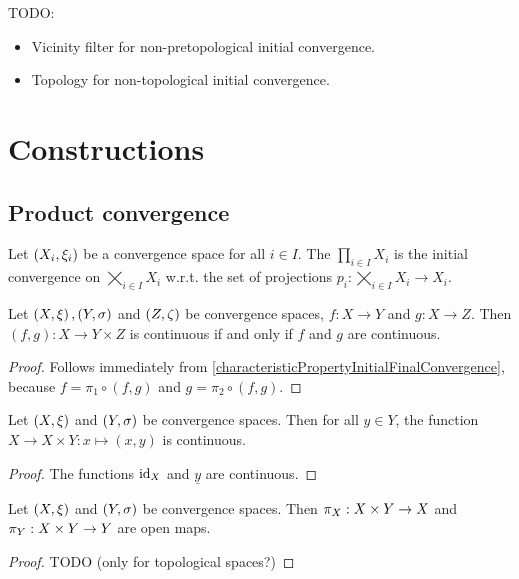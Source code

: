 TODO:
\begin{itemize}
\item Vicinity filter for non-pretopological initial convergence.
\item Topology for non-topological initial convergence.
\end{itemize}


\section{Constructions}
\subsection{Product convergence}
\begin{definition}
Let $\left( X_i, \xi_i \right)$ be a convergence space for all $i\in I$. The  $\prod_{i\in I}X_i$ is the initial convergence on $\bigtimes_{i\in I}X_i$ w.r.t. the set of projections $p_i: \bigtimes_{i\in I}X_i \to X_i$.
\end{definition}

\begin{lemma} \label{continuityFunctionTuple}
Let $\left( X,\xi \right), \left( Y,\sigma \right)$ and $\left( Z,\zeta \right)$ be convergence spaces, $f: X\to Y$ and $g: X\to Z$. Then $(f,g): X\to Y\times Z$ is continuous \textup{if and only if} $f$ and $g$ are continuous.
\end{lemma}
\begin{proof}
Follows immediately from \ref{characteristicPropertyInitialFinalConvergence},
because $f = \pi_1\circ (f,g)$ and $g = \pi_2\circ (f,g)$.
\end{proof}
\begin{corollary} \label{continuousEmbeddingProduct}
Let $\left( X,\xi \right)$ and $\left( Y,\sigma \right)$ be convergence spaces. Then for all $y\in Y$, the function $X\to X\times Y: x\mapsto (x,y)$ is continuous.
\end{corollary}
\begin{proof}
The functions $\operatorname{id}_X$ and $\underline{y}$ are continuous.
\end{proof}

\begin{proposition}
Let $\left( X,\xi \right)$ and $\left( Y,\sigma \right)$ be convergence spaces. Then $\pi_X: X\times Y\to X$ and $\pi_Y: X\times Y\to Y$ are open maps.
\end{proposition}
\begin{proof}
TODO (only for topological spaces?)
\end{proof}

